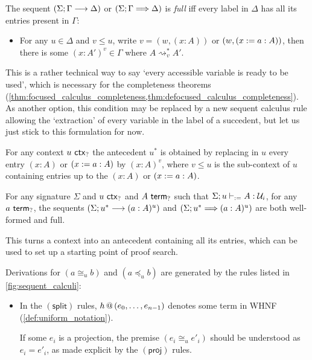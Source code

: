 \documentclass[twoside]{report}
\begin{document}
\begin{definition}
\label{def:full_sequents}
The sequent $(\Sigma; \Gamma \longrightarrow \Delta)$ or $(\Sigma; \Gamma \Longrightarrow \Delta)$ is \emph{full} iff every label in $\Delta$ has all its entries present in $\Gamma$:
\begin{itemize}[noitemsep]
    \item For any $u \in \Delta$ and $v \leq u$, write $v = (w, (x : A))$ or $(w, (x := a : A))$, then there is some $(x : A')^v \in \Gamma$ where $A \rightsquigarrow^\ast_v A'$.
\end{itemize}
\end{definition}

This is a rather technical way to say `every accessible variable is ready to be used', which is necessary for the completeness theorems (\cref{thm:focused_calculus_completeness,thm:defocused_calculus_completeness}). As another option, this condition may be replaced by a new sequent calculus rule allowing the `extraction' of every variable in the label of a succedent, but let us just stick to this formulation for now.

\begin{definition}
\label{def:sequents_and_contexts}
For any context $u \ \mathsf{ctx}_{?}$ the antecedent $u^\ast$ is obtained by replacing in $u$ every entry $(x : A)$ or $(x := a : A)$ by $(x : A)^v$, where $v \leq u$ is the sub-context of $u$ containing entries up to the $(x : A)$ or $(x := a : A)$.
\end{definition}

\begin{example}
\label{thm:well_formed_sequents_from_contexts}
For any signature $\Sigma$ and $u \ \mathsf{ctx}_{?}$ and $A \ \mathsf{term}_{?}$ such that $\Sigma; u \vdash_{:=} A : \mathcal U_i$, for any $a \ \mathsf{term}_{?}$, the sequents $(\Sigma; u^\ast \longrightarrow (a : A)^u)$ and $(\Sigma; u^\ast \Longrightarrow (a : A)^u)$ are both well-formed and full.
\end{example}

This turns a context into an antecedent containing all its entries, which can be used to set up a starting point of proof search.

\begin{definition}
\label{def:conversion_calculus}
Derivations for $(a \cong_u b)$ and $(a \preceq_u b)$ are generated by the rules listed in \cref{fig:sequent_calculi}:
\begin{itemize}
    \item In the $(\mathsf{split})$ rules, ${h}\,@\,({e_0, \ldots, e_{n-1}})$ denotes some term in WHNF (\cref{def:uniform_notation}).
    
    If some $e_i$ is a projection, the premise $(e_i \cong_u e'_i)$ should be understood as $e_i = e'_i$, as made explicit by the $(\mathsf{proj})$ rules.
\end{itemize}
\end{definition}
\end{document}

